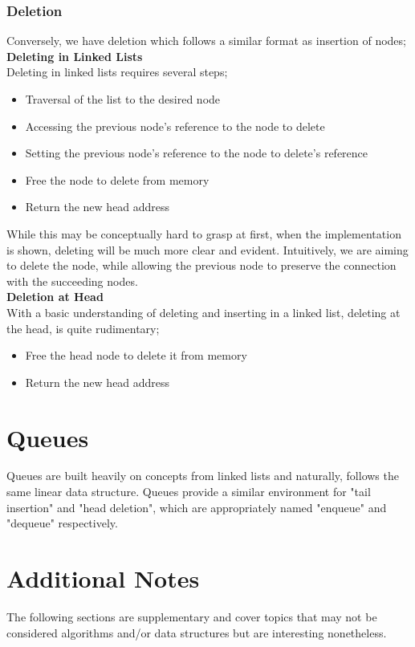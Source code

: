 \documentclass[11pt]{article}
\begin{document}
\subsubsection{Deletion}
Conversely, we have deletion which follows a similar format as insertion of nodes;\\[0.5\baselineskip]
\textbf{Deleting in Linked Lists}\\
Deleting in linked lists requires several steps;
\begin{itemize}
    \item Traversal of the list to the desired node
    \item Accessing the previous node's reference to the node to delete
    \item Setting the previous node's reference to the node to delete's reference 
    \item Free the node to delete from memory
    \item Return the new head address
\end{itemize}
While this may be conceptually hard to grasp at first, when the implementation is shown, deleting will be much more clear and evident. Intuitively, we are aiming to delete the node, while allowing the previous node to preserve the connection with the succeeding nodes.\\[0.5\baselineskip]
\textbf{Deletion at Head}\\
With a basic understanding of deleting and inserting in a linked list, deleting at the head, is quite rudimentary;
\begin{itemize}
    \item Free the head node to delete it from memory
    \item Return the new head address
\end{itemize}

\section{Queues}
Queues are built heavily on concepts from linked lists and naturally, follows the same linear data structure. Queues provide a similar environment for "tail insertion" and "head deletion", which are appropriately named "enqueue" and "dequeue" respectively.
\section{Additional Notes}
The following sections are supplementary and cover topics that may not be considered algorithms and/or data structures but are interesting nonetheless.
\end{document}

